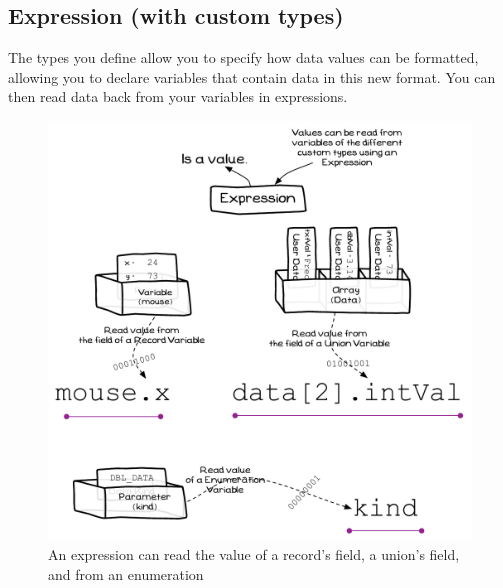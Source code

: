 \clearpage
\subsection{Expression (with custom types)} %
\label{sub:expression_with_custom_types}

The types you define allow you to specify how data values can be formatted, allowing you to declare variables that contain data in this new format. You can then read data back from your variables in expressions.

\begin{figure}[h]
   \centering
   \includegraphics[width=\textwidth]{./topics/type-decl/diagrams/Expression} 
   \caption{An expression can read the value of a record's field, a union's field, and from an enumeration}
   \label{fig:type-decl-expression}
\end{figure}


